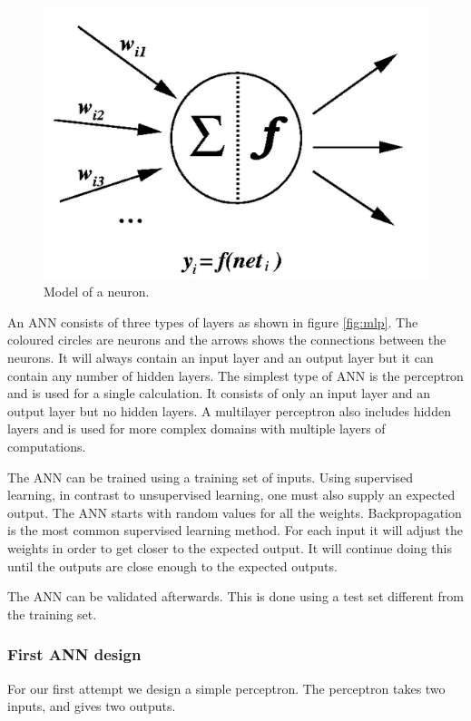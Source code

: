 \begin{figure}[H]
  \center
    \includegraphics[scale=0.4]{images/nn/neuron.png}
  \caption{Model of a neuron. \label{fig:neuron}}
\end{figure}

An ANN consists of three types of layers as shown in figure \ref{fig:mlp}. The coloured circles are neurons and the arrows shows the connections between the neurons. It will always contain an input layer and an output layer but it can contain any number of hidden layers. The simplest type of ANN is the perceptron and is used for a single calculation. It consists of only an input layer and an output layer but no hidden layers. A multilayer perceptron also includes hidden layers and is used for more complex domains with multiple layers of computations.


\vspace{4mm}


The ANN can be trained using a training set of inputs. Using supervised learning, in contrast to unsupervised learning, one must also supply an expected output. The ANN starts with random values for all the weights. Backpropagation is the most common supervised learning method. For each input it will adjust the weights in order to get closer to the expected output. It will continue doing this until the outputs are close enough to the expected outputs.

The ANN can be validated afterwards. This is done using a test set different from the training set.

\subsubsection{First ANN design}
For our first attempt we design a simple perceptron. The perceptron takes two inputs, and gives two outputs. 

